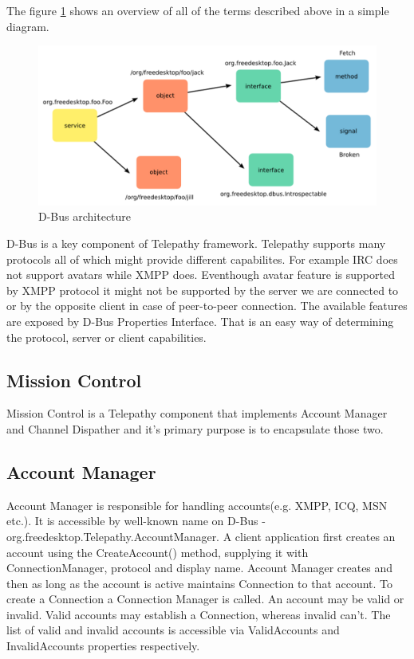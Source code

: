 The figure \ref{fig:dbusArchitecture} shows an overview of all of the terms described above in a simple diagram.

\begin{figure}[ht]
\begin{center}
	\includegraphics[width=15cm]{fig/dbus-architecture-overview.png}
	\caption{D-Bus architecture\cite{TPWiki}}
	\label{fig:dbusArchitecture}
\end{center}
\end{figure}

D-Bus is a key component of Telepathy framework. Telepathy supports many protocols all of which might provide different capabilites. For example IRC does not support avatars while XMPP does. Eventhough avatar feature is supported by XMPP protocol it might not be supported by the server we are connected to or by the opposite client in case of peer-to-peer connection. The available features are exposed by D-Bus Properties Interface. That is an easy way of determining the protocol, server or client capabilities.\cite{dbus}

\subsection*{Mission Control}
Mission Control is a Telepathy component that implements Account Manager and Channel Dispather and it's primary purpose is to encapsulate those two.\cite{TPWiki}

\subsection*{Account Manager}
Account Manager is responsible for handling accounts(e.g. XMPP, ICQ, MSN etc.). It is accessible by well-known name on D-Bus - org.freedesktop.Telepathy.AccountManager. A client application first creates an account using the CreateAccount() method, supplying it with ConnectionManager, protocol and display name. Account Manager creates and then as long as the account is active maintains Connection to that account. To create a Connection a Connection Manager is called. An account may be valid or invalid. Valid accounts may establish a Connection, whereas invalid can't. The list of valid and invalid accounts is accessible via ValidAccounts and InvalidAccounts properties respectively.\cite{TPWiki} 

